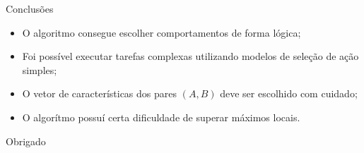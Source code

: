 \documentclass{beamer}
\begin{document}

\begin{frame}
\centerline{\Huge{Conclusões}}
\begin{itemize}
	\item O algoritmo consegue escolher comportamentos de forma lógica;
	\item Foi possível executar tarefas complexas utilizando modelos de seleção de ação simples;
	\item O vetor de características dos pares $ \left( A, B \right) $ deve ser escolhido com cuidado;
	\item O algorítmo possuí certa dificuldade de superar máximos locais.
\end{itemize}
\end{frame}


\begin{frame}


\end{frame}

\begin{frame}
\Huge{\centerline{Obrigado}}
\end{frame}


\end{document}
